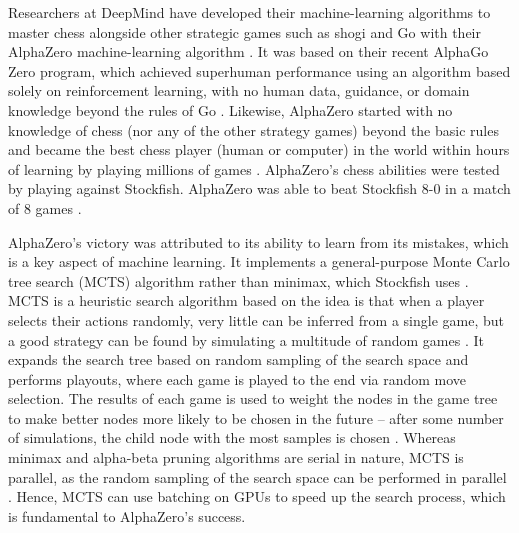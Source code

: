 \documentclass[%
 superscriptaddress,
showpacs,preprintnumbers,
 amsmath,
 amssymb,
 aps,
 pra,
showkeys,
onecolumn,
notitlepage,
11pt,
tightenlines      %
]{revtex4-1}
\begin{document}
Researchers at DeepMind have developed their machine-learning algorithms to master chess alongside other strategic games such as shogi and Go with their AlphaZero machine-learning algorithm \cite{silver2018general}. It was based on their recent AlphaGo Zero program, which achieved superhuman performance using an algorithm based solely on reinforcement learning, with no human data, guidance, or domain knowledge beyond the rules of Go \cite{silver2017mastering}. Likewise, AlphaZero started with no knowledge of chess (nor any of the other strategy games) beyond the basic rules and became the best chess player (human or computer) in the world within hours of learning by playing millions of games \cite{strogatz2018one}. AlphaZero's chess abilities were tested by playing against Stockfish. AlphaZero was able to beat Stockfish 8-0 in a match of 8 games \cite{silver2018general}.

AlphaZero's victory was attributed to its ability to learn from its mistakes, which is a key aspect of machine learning. It implements a general-purpose Monte Carlo tree search (MCTS) algorithm rather than minimax, which Stockfish uses \cite{silver2017mastering2}. MCTS is a heuristic search algorithm based on the idea is that when a player selects their actions randomly, very little can be inferred from a single game, but a good strategy can be found by simulating a multitude of random games \cite{chaslot2008monte}. It expands the search tree based on random sampling of the search space and performs playouts, where each game is played to the end via random move selection. The results of each game is used to weight the nodes in the game tree to make better nodes more likely to be chosen in the future -- after some number of simulations, the child node with the most samples is chosen \cite{chaslot2008monte}. Whereas minimax and alpha-beta pruning algorithms are serial in nature, MCTS is parallel, as the random sampling of the search space can be performed in parallel \cite{silver2017mastering2}. Hence, MCTS can use batching on GPUs to speed up the search process, which is fundamental to AlphaZero's success.
\end{document}
